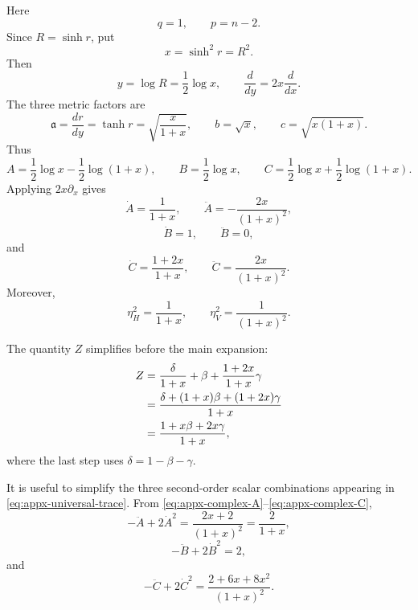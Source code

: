 \documentclass[11pt,reqno]{amsart}
\numberwithin{equation}{section}
\theoremstyle{definition}
\theoremstyle{remark}
\begin{document}
Here
\[
q=1,\qquad p=n-2.
\]
Since $R=\sinh r$, put
\[
x=\sinh^2r=R^2.
\]
Then
\[
y=\log R=\frac{1}{2}\log x,
\qquad
\frac{d}{dy}=2x\frac{d}{dx}.
\]
The three metric factors are
\[
\mathfrak a=\frac{dr}{dy}=\tanh r=\sqrt{\frac{x}{1+x}},
\qquad
b=\sqrt x,
\qquad
c=\sqrt{x(1+x)}.
\]
Thus
\[
A=\frac{1}{2}\log x-\frac{1}{2}\log(1+x),
\qquad
B=\frac{1}{2}\log x,
\qquad
C=\frac{1}{2}\log x+\frac{1}{2}\log(1+x).
\]
Applying $2x\partial_x$ gives
\begin{equation}
\dot A=\frac{1}{1+x},
\qquad
\ddot A=-\frac{2x}{(1+x)^2},
\label{eq:appx-complex-A}
\end{equation}
\begin{equation}
\dot B=1,
\qquad
\ddot B=0,
\label{eq:appx-complex-B}
\end{equation}
and
\begin{equation}
\dot C=\frac{1+2x}{1+x},
\qquad
\ddot C=\frac{2x}{(1+x)^2}.
\label{eq:appx-complex-C}
\end{equation}
Moreover,
\begin{equation}
\eta_H^2=\frac{1}{1+x},
\qquad
\eta_V^2=\frac{1}{(1+x)^2}.
\label{eq:appx-complex-eta}
\end{equation}

The quantity $Z$ simplifies before the main expansion:
\begin{align}
Z
&=\frac{\delta}{1+x}+\beta+\frac{1+2x}{1+x}\gamma\notag\\
&=\frac{\delta+(1+x)\beta+(1+2x)\gamma}{1+x}\notag\\
&=\frac{1+x\beta+2x\gamma}{1+x},
\label{eq:appx-complex-Z}
\end{align}
where the last step uses $\delta=1-\beta-\gamma$.

It is useful to simplify the three second-order scalar combinations appearing
in \eqref{eq:appx-universal-trace}.  From
\eqref{eq:appx-complex-A}--\eqref{eq:appx-complex-C},
\begin{equation}
-\ddot A+2\dot A^2
=\frac{2x+2}{(1+x)^2}
=\frac{2}{1+x},
\label{eq:appx-complex-SA}
\end{equation}
\begin{equation}
-\ddot B+2\dot B^2=2,
\label{eq:appx-complex-SB}
\end{equation}
and
\begin{equation}
-\ddot C+2\dot C^2
=\frac{2+6x+8x^2}{(1+x)^2}.
\label{eq:appx-complex-SC}
\end{equation}
\end{document}
